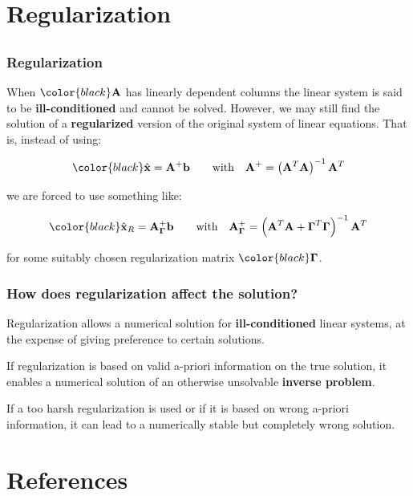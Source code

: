 \documentclass[compress]{beamer}
\newcommand{\black}[1]{{\color{black}#1}}
\renewcommand{\emph}[1]{\textbf{\black{#1}}}
\newcommand{\beq}[1]{\[\black{#1}\]}
\begin{document}
\section{Regularization}
\subsection*{}

\begin{frame}[fragile]
\frametitle{Regularization}

When $\black{\A}$ has linearly dependent columns the linear system is said to be \emph{ill-conditioned} and cannot be solved. However, we may still find the solution of a \emph{regularized} version of the original system of linear equations. That is, instead of using:


\beq{
\hat{\x} = \A^+\b		\qquad \textrm{with}\quad \A^+ = \left(\A^T\A\right)^{-1}\A^T
}

we are forced to use something like:

\beq{
\hat{\x}_R = \A^+_{\Gammam}\b		\qquad \textrm{with}\quad \A^+_{\Gammam}= \left(\A^T\A + \Gammam^T\Gammam\right)^{-1}\A^T
}

for some suitably chosen regularization matrix $\black{\Gammam}$.

\end{frame}


\begin{frame}[fragile]
\frametitle{How does regularization affect the solution?}

Regularization allows a numerical solution for \emph{ill-conditioned} linear systems, at the expense of giving preference to certain solutions.

\vspace{.5cm}
If regularization is based on valid a-priori information on the true solution, it enables a numerical solution of an otherwise unsolvable \emph{inverse problem}.

\vspace{.5cm}
If a too harsh regularization is used or if it is based on wrong a-priori information, it can lead to a numerically stable but completely wrong solution.


\end{frame}



\section{References}
\end{document}

